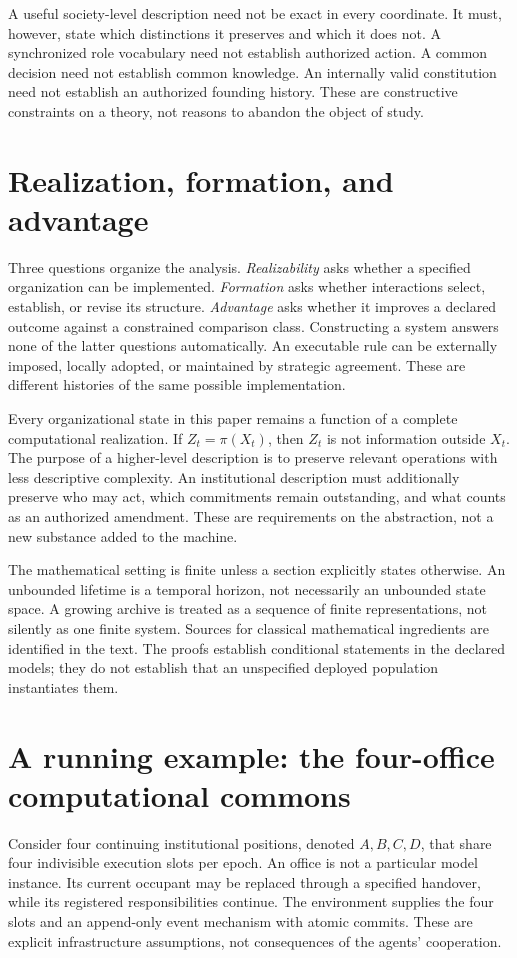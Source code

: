 \documentclass[11pt,letterpaper]{article}
\theoremstyle{plain}
\theoremstyle{definition}
\theoremstyle{remark}
\begin{document}
A useful society-level description need not be exact in every coordinate. It must, however, state which distinctions it preserves and which it does not. A synchronized role vocabulary need not establish authorized action. A common decision need not establish common knowledge. An internally valid constitution need not establish an authorized founding history. These are constructive constraints on a theory, not reasons to abandon the object of study.

\section{Realization, formation, and advantage}\label{sec:scope}
Three questions organize the analysis. \emph{Realizability} asks whether a specified organization can be implemented. \emph{Formation} asks whether interactions select, establish, or revise its structure. \emph{Advantage} asks whether it improves a declared outcome against a constrained comparison class. Constructing a system answers none of the latter questions automatically. An executable rule can be externally imposed, locally adopted, or maintained by strategic agreement. These are different histories of the same possible implementation.

Every organizational state in this paper remains a function of a complete computational realization. If $Z_t=\pi(X_t)$, then $Z_t$ is not information outside $X_t$. The purpose of a higher-level description is to preserve relevant operations with less descriptive complexity. An institutional description must additionally preserve who may act, which commitments remain outstanding, and what counts as an authorized amendment. These are requirements on the abstraction, not a new substance added to the machine.

The mathematical setting is finite unless a section explicitly states otherwise. An unbounded lifetime is a temporal horizon, not necessarily an unbounded state space. A growing archive is treated as a sequence of finite representations, not silently as one finite system. Sources for classical mathematical ingredients are identified in the text. The proofs establish conditional statements in the declared models; they do not establish that an unspecified deployed population instantiates them.


\section{A running example: the four-office computational commons}\label{sec:commons}
Consider four continuing institutional positions, denoted $A,B,C,D$, that share four indivisible execution slots per epoch. An office is not a particular model instance. Its current occupant may be replaced through a specified handover, while its registered responsibilities continue. The environment supplies the four slots and an append-only event mechanism with atomic commits. These are explicit infrastructure assumptions, not consequences of the agents' cooperation.
\end{document}
